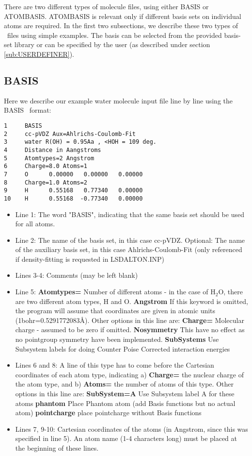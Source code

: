 There are two different types of molecule files, using either BASIS or ATOMBASIS.
ATOMBASIS is relevant only if different basis sets on individual atoms are required.
In the first two subsections, we describe these two types of \mol\ files using simple examples.
The basis can be selected from the provided basis-set library or can be specified by 
the user (as described under section \ref{sub:USERDEFINER}).

\subsection{BASIS}


Here we describe our example water molecule input file line by line using the BASIS \mol\ format:
\begin{verbatim}
1     BASIS
2     cc-pVDZ Aux=Ahlrichs-Coulomb-Fit
3     water R(OH) = 0.95Aa , <HOH = 109 deg.
4     Distance in Aangstroms
5     Atomtypes=2 Angstrom
6     Charge=8.0 Atoms=1
7     O      0.00000   0.00000   0.00000
8     Charge=1.0 Atoms=2
9     H      0.55168   0.77340   0.00000
10    H      0.55168  -0.77340   0.00000
\end{verbatim} 

\begin{itemize}
\item Line 1: The word "BASIS", indicating that the same basis set should be used for all 
atoms.
\item Line 2: The name of the basis set, in this case cc-pVDZ. Optional: The name
of the auxiliary basis set, in this case Ahlrichs-Coulomb-Fit
(only referenced if density-fitting is requested in LSDALTON.INP)
\item Lines 3-4: Comments (may be left blank)
\item Line 5: {\bf Atomtypes=} Number of different atoms - in the case of H$_2$O, there are two different
atom types, H and O. {\bf Angstrom} If this keyword is omitted, the program will assume that coordinates
are given in atomic units (1bohr=0.5291772083{\AA}). Other options in this line are:
{\bf Charge=} Molecular charge - assumed to be zero if omitted. 
{\bf Nosymmetry} This have no effect as no pointgroup symmetry have been implemented. 
{\bf SubSystems} Use Subsystem labels for doing Counter Poise Corrected interaction energies
\item Lines 6 and 8: A line of this type has to come before the Cartesian coordinates of each atom
type, indicating a) {\bf Charge=} the nuclear charge of the atom type, and b) {\bf Atoms=} the number of atoms of this type.
Other options in this line are:
{\bf SubSystem=A} Use Subsystem label A for these atoms
{\bf phantom} Place Phantom atom (add Basis functions but no actual atom)
{\bf pointcharge} place pointcharge without Basis functions
\item Lines 7, 9-10: Cartesian coordinates of the atoms (in Angstrom, since this was specified 
in line 5). An atom name (1-4 characters long) must be placed at the beginning of these lines.
\end{itemize}

